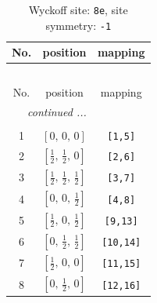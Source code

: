 \documentclass[fleqn,8pt]{jsarticle}
\begin{document}
\renewcommand{\arraystretch}{1.2}
\begin{longtable}{ccc}
\caption{Wyckoff site: {\tt 8e}, site symmetry: {\tt -1}}
 \\
 \hline \hline
No. & position & mapping \\ \hline \endfirsthead

\multicolumn{2}{l}{\tablename\ \thetable{}} \\
 \hline \hline
No. & position & mapping \\ \hline \endhead

 \hline \hline
\multicolumn{2}{r}{\footnotesize\it continued ...} \\ \endfoot

 \hline \hline
\multicolumn{2}{r}{} \\ \endlastfoot

1 & $\left[ 0,\, 0,\, 0 \right]$ & {\tt [1,5]} \\ \hline
2 & $\left[ \frac{1}{2},\, \frac{1}{2},\, 0 \right]$ & {\tt [2,6]} \\ \hline
3 & $\left[ \frac{1}{2},\, \frac{1}{2},\, \frac{1}{2} \right]$ & {\tt [3,7]} \\ \hline
4 & $\left[ 0,\, 0,\, \frac{1}{2} \right]$ & {\tt [4,8]} \\ \hline
5 & $\left[ \frac{1}{2},\, 0,\, \frac{1}{2} \right]$ & {\tt [9,13]} \\ \hline
6 & $\left[ 0,\, \frac{1}{2},\, \frac{1}{2} \right]$ & {\tt [10,14]} \\ \hline
7 & $\left[ \frac{1}{2},\, 0,\, 0 \right]$ & {\tt [11,15]} \\ \hline
8 & $\left[ 0,\, \frac{1}{2},\, 0 \right]$ & {\tt [12,16]} \\
\end{longtable}
\renewcommand{\arraystretch}{1.2}
\end{document}
